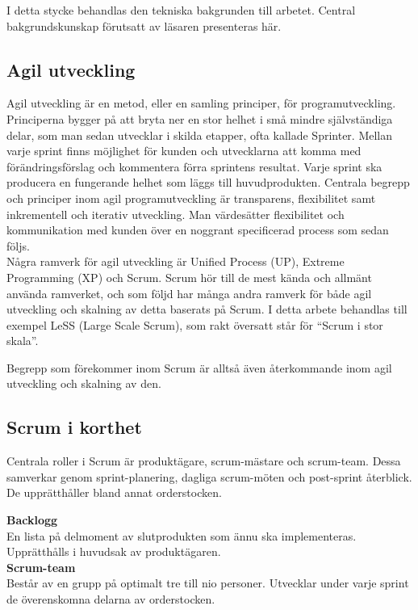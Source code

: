 	I detta stycke behandlas den tekniska bakgrunden till arbetet. Central bakgrundskunskap förutsatt av läsaren presenteras här.
	
	\subsection{Agil utveckling}
	
		Agil utveckling är en metod, eller en samling principer, för programutveckling. Principerna bygger på att bryta ner en stor helhet i små mindre självständiga delar, som man sedan utvecklar i skilda etapper, ofta kallade Sprinter.
		Mellan varje sprint finns möjlighet för kunden och utvecklarna att komma med förändringsförslag och kommentera förra sprintens resultat. Varje sprint ska producera en fungerande helhet som läggs till huvudprodukten. Centrala begrepp och principer inom agil programutveckling är transparens, flexibilitet samt inkrementell och iterativ utveckling. Man värdesätter flexibilitet och kommunikation med kunden över en noggrant specificerad process som sedan följs. \cite{agile_manifesto}
		\\
		Några ramverk för agil utveckling är Unified Process (UP), Extreme Programming (XP) och Scrum.
		Scrum hör till de mest kända och allmänt använda ramverket, och som följd har många andra ramverk för både agil utveckling och skalning av detta baserats på Scrum. I detta arbete behandlas till exempel LeSS (Large Scale Scrum), som rakt översatt står för ``Scrum i stor skala''.
		
		Begrepp som förekommer inom Scrum är alltså även återkommande inom agil utveckling och skalning av den.
		
	\subsection{Scrum i korthet}	
		
		Centrala roller i Scrum är produktägare, scrum-mästare och scrum-team. Dessa samverkar genom sprint-planering, dagliga scrum-möten och post-sprint återblick. De upprätthåller bland annat orderstocken.
		
		\textbf{Backlogg} \\
		En lista på delmoment av slutprodukten som ännu ska implementeras. Upprätthålls i huvudsak av produktägaren. \\	
		
		\textbf{Scrum-team} \\
		Består av en grupp på optimalt tre till nio personer. Utvecklar under varje sprint de överenskomna delarna av orderstocken. \\
		
